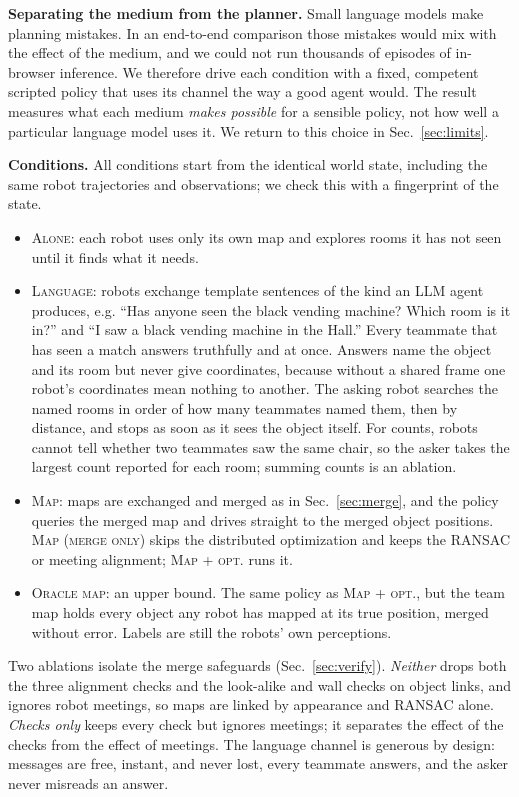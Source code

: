 \documentclass[conference]{IEEEtran}
\newcommand{\cond}[1]{\textsc{#1}}
\begin{document}
\textbf{Separating the medium from the planner.}
Small language models make planning mistakes.
In an end-to-end comparison those mistakes would mix with the effect of the medium, and we could not run thousands of episodes of in-browser inference.
We therefore drive each condition with a fixed, competent scripted policy that uses its channel the way a good agent would.
The result measures what each medium \emph{makes possible} for a sensible policy, not how well a particular language model uses it.
We return to this choice in Sec.~\ref{sec:limits}.

\textbf{Conditions.}
All conditions start from the identical world state, including the same robot trajectories and observations; we check this with a fingerprint of the state.
\begin{itemize}
\item \cond{Alone}: each robot uses only its own map and explores rooms it has not seen until it finds what it needs.
\item \cond{Language}: robots exchange template sentences of the kind an LLM agent produces, e.g. ``Has anyone seen the black vending machine? Which room is it in?'' and ``I saw a black vending machine in the Hall.''
Every teammate that has seen a match answers truthfully and at once.
Answers name the object and its room but never give coordinates, because without a shared frame one robot's coordinates mean nothing to another.
The asking robot searches the named rooms in order of how many teammates named them, then by distance, and stops as soon as it sees the object itself.
For counts, robots cannot tell whether two teammates saw the same chair, so the asker takes the largest count reported for each room; summing counts is an ablation.
\item \cond{Map}: maps are exchanged and merged as in Sec.~\ref{sec:merge}, and the policy queries the merged map and drives straight to the merged object positions. \cond{Map (merge only)} skips the distributed optimization and keeps the RANSAC or meeting alignment; \cond{Map + opt.} runs it.
\item \cond{Oracle map}: an upper bound. The same policy as \cond{Map + opt.}, but the team map holds every object any robot has mapped at its true position, merged without error. Labels are still the robots' own perceptions.
\end{itemize}
Two ablations isolate the merge safeguards (Sec.~\ref{sec:verify}). \emph{Neither} drops both the three alignment checks and the look-alike and wall checks on object links, and ignores robot meetings, so maps are linked by appearance and RANSAC alone. \emph{Checks only} keeps every check but ignores meetings; it separates the effect of the checks from the effect of meetings.
The language channel is generous by design: messages are free, instant, and never lost, every teammate answers, and the asker never misreads an answer.
\end{document}

